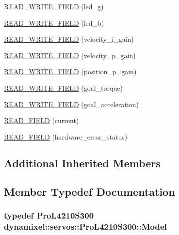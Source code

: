 \begin{DoxyCompactItemize}
\item 
\hyperlink{classdynamixel_1_1servos_1_1_pro_l4210_s300_aeec76cbdf824d96172ac8812a8d1780e}{R\+E\+A\+D\+\_\+\+W\+R\+I\+T\+E\+\_\+\+F\+I\+E\+LD} (led\+\_\+g)
\item 
\hyperlink{classdynamixel_1_1servos_1_1_pro_l4210_s300_a0aa08ab4ec4a5cac2a5eac3330895e38}{R\+E\+A\+D\+\_\+\+W\+R\+I\+T\+E\+\_\+\+F\+I\+E\+LD} (led\+\_\+b)
\item 
\hyperlink{classdynamixel_1_1servos_1_1_pro_l4210_s300_a2f3e87529061a36b80f346f92e19807b}{R\+E\+A\+D\+\_\+\+W\+R\+I\+T\+E\+\_\+\+F\+I\+E\+LD} (velocity\+\_\+i\+\_\+gain)
\item 
\hyperlink{classdynamixel_1_1servos_1_1_pro_l4210_s300_a4921ecd90be710332856fa76f4a4f8e5}{R\+E\+A\+D\+\_\+\+W\+R\+I\+T\+E\+\_\+\+F\+I\+E\+LD} (velocity\+\_\+p\+\_\+gain)
\item 
\hyperlink{classdynamixel_1_1servos_1_1_pro_l4210_s300_a203f1c9374541432e33e367002cec23b}{R\+E\+A\+D\+\_\+\+W\+R\+I\+T\+E\+\_\+\+F\+I\+E\+LD} (position\+\_\+p\+\_\+gain)
\item 
\hyperlink{classdynamixel_1_1servos_1_1_pro_l4210_s300_a5a0a0a36eb996f9e77708ca181455fe9}{R\+E\+A\+D\+\_\+\+W\+R\+I\+T\+E\+\_\+\+F\+I\+E\+LD} (goal\+\_\+torque)
\item 
\hyperlink{classdynamixel_1_1servos_1_1_pro_l4210_s300_a94e3f934c7a11adafb592c1854219d49}{R\+E\+A\+D\+\_\+\+W\+R\+I\+T\+E\+\_\+\+F\+I\+E\+LD} (goal\+\_\+acceleration)
\item 
\hyperlink{classdynamixel_1_1servos_1_1_pro_l4210_s300_a73d43171e4cf0e30d0657028a30c61cd}{R\+E\+A\+D\+\_\+\+F\+I\+E\+LD} (current)
\item 
\hyperlink{classdynamixel_1_1servos_1_1_pro_l4210_s300_ab640fe2d0438c252b62cefc7fe4f1e33}{R\+E\+A\+D\+\_\+\+F\+I\+E\+LD} (hardware\+\_\+error\+\_\+status)
\end{DoxyCompactItemize}
\subsection*{Additional Inherited Members}


\subsection{Member Typedef Documentation}
\subsubsection[{\texorpdfstring{Model}{Model}}]{\setlength{\rightskip}{0pt plus 5cm}typedef {\bf Pro\+L4210\+S300} {\bf dynamixel\+::servos\+::\+Pro\+L4210\+S300\+::\+Model}}\hypertarget{classdynamixel_1_1servos_1_1_pro_l4210_s300_a1b4b259aea6c0b456ca339f0268ec843}{}\label{classdynamixel_1_1servos_1_1_pro_l4210_s300_a1b4b259aea6c0b456ca339f0268ec843}


